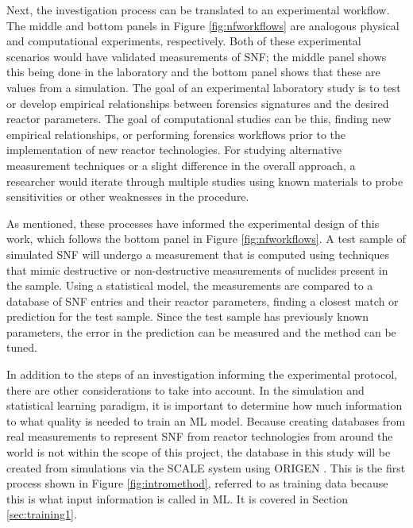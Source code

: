 Next, the investigation process can be translated to an experimental workflow.
The middle and bottom panels in Figure \ref{fig:nfworkflows} are analogous
physical and computational experiments, respectively.  Both of these
experimental scenarios would have validated measurements of \gls{SNF}; the
middle panel shows this being done in the laboratory and the bottom panel shows
that these are values from a simulation. The goal of an experimental laboratory
study is to test or develop empirical relationships between forensics
signatures and the desired reactor parameters. The goal of computational
studies can be this, finding new empirical relationships, or performing
forensics workflows prior to the implementation of new reactor technologies.
For studying alternative measurement techniques or a slight difference in the
overall approach, a researcher would iterate through multiple studies using
known materials to probe sensitivities or other weaknesses in the procedure.

As mentioned, these processes have informed the experimental design of this
work, which follows the bottom panel in Figure \ref{fig:nfworkflows}. A test
sample of simulated \gls{SNF} will undergo a measurement that is computed using
techniques that mimic destructive or non-destructive measurements of nuclides
present in the sample.  Using a statistical model, the measurements are
compared to a database of \gls{SNF} entries and their reactor parameters,
finding a closest match or prediction for the test sample. Since the test
sample has previously known parameters, the error in the prediction can be
measured and the method can be tuned. 

In addition to the steps of an investigation informing the experimental
protocol, there are other considerations to take into account. In the
simulation and statistical learning paradigm, it is important to determine how
much information to what quality is needed to train an \gls{ML} model. Because
creating databases from real measurements to represent \gls{SNF} from reactor
technologies from around the world is not within the scope of this project, the
database in this study will be created from simulations via the \gls{SCALE}
\cite{scale} system using \gls{ORIGEN} \cite{origen, origenarp}. This is the
first process shown in Figure \ref{fig:intromethod}, referred to as training
data because this is what input information is called in \gls{ML}. It is
covered in Section \ref{sec:training1}.

